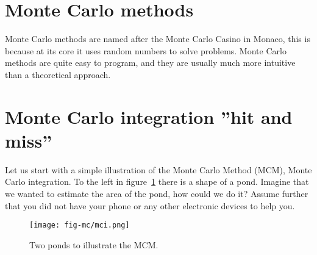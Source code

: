 \documentclass[graybox,sectrefs,envcountresetchap,open=right,final]{svmonodo}
\begin{document}
\section{Monte Carlo methods}
Monte Carlo methods are named after the Monte Carlo Casino in Monaco,
this is because at its core it uses random numbers to solve problems.
Monte Carlo methods are quite easy to program, and they are
usually much more intuitive than a theoretical approach. 



\section{Monte Carlo integration  ''hit and miss''}
Let us start with a simple illustration of the Monte Carlo Method (MCM), Monte Carlo integration. To the left
in figure~\ref{fig:mc:mci} there is a shape of a pond. Imagine that we wanted to estimate the area of the pond, how could
we do it? Assume further that you did not have your phone or any other electronic devices to help you. 

\begin{figure}[!ht]  %
  \centerline{\texttt{[image: fig-mc/mci.png]}}
  \caption{
  Two ponds to illustrate the MCM. \label{fig:mc:mci}
  }
\end{figure}
\end{document}
